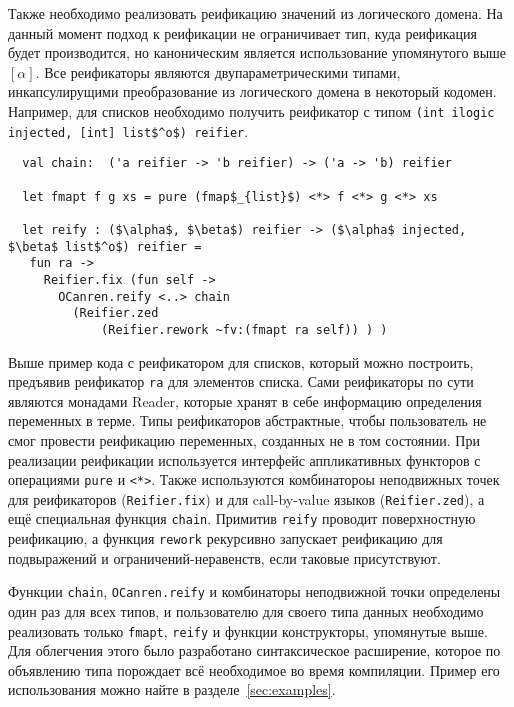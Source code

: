 Также необходимо реализовать реификацию значений из логического домена.
На данный момент подход к реификации не ограничивает тип, куда реификация будет производится, но каноническим является использование упомянутого выше $[\alpha]$.
Все реификаторы являются двупараметрическими типами, инкапсулирущими преобразование из логического домена в некоторый кодомен.
Например, для списков необходимо получить реификатор с типом \lstinline=(int ilogic injected, [int] list$^o$) reifier=.

\begin{lstlisting}
  val chain:  ('a reifier -> 'b reifier) -> ('a -> 'b) reifier

  let fmapt f g xs = pure (fmap$_{list}$) <*> f <*> g <*> xs

  let reify : ($\alpha$, $\beta$) reifier -> ($\alpha$ injected, $\beta$ list$^o$) reifier =
   fun ra ->
     Reifier.fix (fun self ->
       OCanren.reify <..> chain
         (Reifier.zed
             (Reifier.rework ~fv:(fmapt ra self)) ) )
\end{lstlisting}

\noindent Выше пример кода с реификатором для списков, который можно построить, предъявив реификатор \lstinline=ra= для элементов списка.
Сами реификаторы по сути являются монадами Reader, которые хранят в себе информацию определения переменных в терме.
Типы реификаторов абстрактные, чтобы пользователь не смог провести реификацию переменных, созданных не в том состоянии.
При реализации реификации используется интерфейс аппликативных функторов с операциями \lstinline=pure=  и \lstinline=<*>=.
Также используются комбинатороы неподвижных точек для реификаторов (\lstinline=Reifier.fix=) и для call-by-value языков (\lstinline=Reifier.zed=),
а ещё специальная функция \lstinline=chain=. Примитив \lstinline=reify= проводит поверхностную реификацию, а функция \lstinline=rework= рекурсивно запускает реификацию для подвыражений и ограничений-неравенств, если таковые присутствуют.

Функции \lstinline=chain=, \lstinline=OCanren.reify= и комбинаторы неподвижной точки определены один раз для всех типов, и пользователю для своего типа данных необходимо реализовать только \lstinline=fmapt=, \lstinline=reify= и функции конструкторы, упомянутые выше.
Для облегчения этого было разработано синтаксическое расширение, которое по объявлению типа порождает всё необходимое во время компиляции. Пример его использования можно найте в разделе~\ref{sec:examples}.

